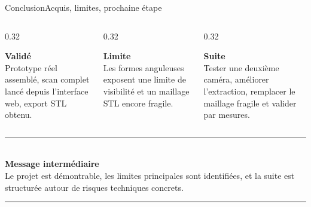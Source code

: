 \documentclass[aspectratio=169,10pt]{beamer}
\begin{document}
\begin{frame}{Conclusion}{Acquis, limites, prochaine étape}
  \vspace{0.15cm}
  \begin{columns}[T,totalwidth=0.94\textwidth]
    \begin{column}{0.32\textwidth}
      \colorbox{softgreen}{%
        \parbox[t][2.45cm][t]{\dimexpr\linewidth-0.45cm\relax}{%
          \scriptsize
          \textbf{\textcolor{deepblue}{Validé}}\\[0.12cm]
          Prototype réel assemblé, scan complet lancé depuis l'interface web, export STL obtenu.
        }%
      }
    \end{column}
    \begin{column}{0.32\textwidth}
      \colorbox{softred}{%
        \parbox[t][2.45cm][t]{\dimexpr\linewidth-0.45cm\relax}{%
          \scriptsize
          \textbf{\textcolor{heigred}{Limite}}\\[0.12cm]
          Les formes anguleuses exposent une limite de visibilité et un maillage STL encore fragile.
        }%
      }
    \end{column}
    \begin{column}{0.32\textwidth}
      \colorbox{softblue}{%
        \parbox[t][2.45cm][t]{\dimexpr\linewidth-0.45cm\relax}{%
          \scriptsize
          \textbf{\textcolor{deepblue}{Suite}}\\[0.12cm]
          Tester une deuxième caméra, améliorer l'extraction, remplacer le maillage fragile et valider par mesures.
        }%
      }
    \end{column}
  \end{columns}

  \vspace{0.32cm}
  \begin{center}
    \begin{minipage}{0.78\textwidth}
      \centering
      \textcolor{linegray}{\rule{\linewidth}{0.5pt}}\\[0.14cm]
      \large\textbf{\textcolor{deepblue}{Message intermédiaire}}\\[0.12cm]
      \small
      Le projet est démontrable, les limites principales sont identifiées, et la suite est structurée autour de risques techniques concrets.\\[0.14cm]
      \textcolor{linegray}{\rule{\linewidth}{0.5pt}}
    \end{minipage}
  \end{center}
\end{frame}
\end{document}
